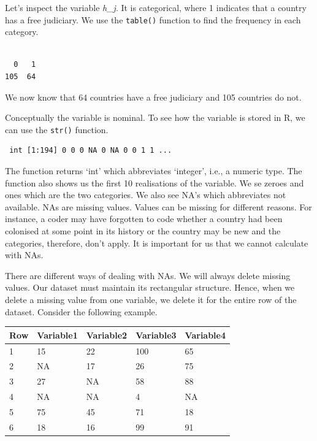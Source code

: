 \documentclass[]{article}
\newenvironment{Shaded}{\begin{snugshade}}{\end{snugshade}}
\newcommand{\KeywordTok}[1]{\textcolor[rgb]{0.13,0.29,0.53}{\textbf{#1}}}
\newcommand{\OperatorTok}[1]{\textcolor[rgb]{0.81,0.36,0.00}{\textbf{#1}}}
\newcommand{\NormalTok}[1]{#1}
\theoremstyle{definition}
\theoremstyle{definition}
\theoremstyle{definition}
\theoremstyle{remark}
\begin{document}
Let's inspect the variable \emph{h\_j}. It is categorical, where 1
indicates that a country has a free judiciary. We use the
\texttt{table()} function to find the frequency in each category.

\begin{Shaded}
\end{Shaded}

\begin{verbatim}

  0   1 
105  64 
\end{verbatim}

We now know that 64 countries have a free judiciary and 105 countries do
not.

Conceptually the variable is nominal. To see how the variable is stored
in R, we can use the \texttt{str()} function.

\begin{Shaded}
\end{Shaded}

\begin{verbatim}
 int [1:194] 0 0 0 NA 0 NA 0 0 1 1 ...
\end{verbatim}

The function returns `int' which abbreviates `integer', i.e., a numeric
type. The function also shows us the first 10 realisations of the
variable. We se zeroes and ones which are the two categories. We also
see NA's which abbreviates not available. NAs are missing values. Values
can be missing for different reasons. For instance, a coder may have
forgotten to code whether a country had been colonised at some point in
its history or the country may be new and the categories, therefore,
don't apply. It is important for us that we cannot calculate with NAs.

There are different ways of dealing with NAs. We will always delete
missing values. Our dataset must maintain its rectangular structure.
Hence, when we delete a missing value from one variable, we delete it
for the entire row of the dataset. Consider the following example.

\begin{tabular}{l|l|l|l|l}
\hline
Row & Variable1 & Variable2 & Variable3 & Variable4\\
\hline
1 & 15 & 22 & 100 & 65\\
\hline
2 & NA & 17 & 26 & 75\\
\hline
3 & 27 & NA & 58 & 88\\
\hline
4 & NA & NA & 4 & NA\\
\hline
5 & 75 & 45 & 71 & 18\\
\hline
6 & 18 & 16 & 99 & 91\\
\hline
\end{tabular}
\end{document}
